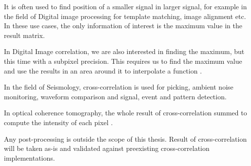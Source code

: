 It is often used to find position of a smaller signal in larger signal, for example in the field of Digital image processing for template matching, image alignment etc. In these use cases, the only information of interest is the maximum value in the result matrix. 

In Digital Image correlation, we are also interested in finding the maximum, but this time with a subpixel precision. This requires us to find the maximum value and use the results in an area around it to interpolate a function \citep{zhang2015} \citep{misko}.

In the field of Seismology, cross-correlation is used for picking, ambient noise monitoring, waveform comparison and signal, event and pattern detection. \citep{Ventosa2019}
 
In optical coherence tomography, the whole result of cross-correlation summed to compute the intensity of each pixel \citep{Kapinchev2015}. 

Any post-processing is outside the scope of this thesis. Result of cross-correlation will be taken as-is and validated against preexisting cross-correlation implementations.


